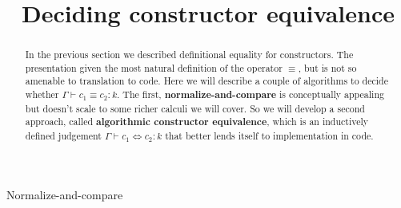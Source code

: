 \documentclass{amsart}
\title{Deciding constructor equivalence}
\begin{document}
\maketitle

\begin{abstract}
    In the previous section we described definitional equality for constructors. The presentation given the most natural definition of the operator $\equiv$, but is not so amenable to translation to code. Here we will describe a couple of algorithms to decide whether $\Gamma \vdash c_1 \equiv c_2 : k$. The first, {\bf normalize-and-compare} is conceptually appealing but doesn't scale to some richer calculi we will cover. So we will develop a second approach, called {\bf algorithmic constructor equivalence}, which is an inductively defined judgement $\Gamma \vdash c_1 \iff c_2 : k$ that better lends itself to implementation in code.
\end{abstract}

\begin{section}{Normalize-and-compare}
\end{section}
\end{document}

